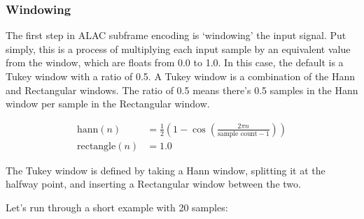 \clearpage

\subsubsection{Windowing}

The first step in ALAC subframe encoding is `windowing' the input signal.
Put simply, this is a process of multiplying each input sample by
an equivalent value from the window, which are floats from 0.0 to 1.0.
In this case, the default is a Tukey window with a ratio of 0.5.
A Tukey window is a combination of the Hann and Rectangular windows.
The ratio of 0.5 means there's 0.5 samples in the Hann window per
sample in the Rectangular window.

\begin{align}
\text{hann}(n) &= \frac{1}{2} \left ( 1 - \cos \left ( \frac{2 \pi n}{\text{sample count} - 1} \right ) \right ) \\
\text{rectangle}(n) &= 1.0
\end{align}

The Tukey window is defined by taking a Hann window, splitting it at
the halfway point, and inserting a Rectangular window between the
two.

\begin{figure}[h]
\end{figure}

Let's run through a short example with 20 samples:

